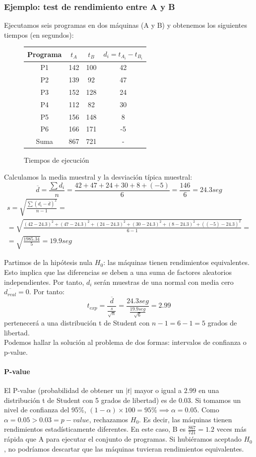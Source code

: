 \documentclass[12pt,spanish]{article}
\begin{document}
\subsubsection{Ejemplo: test de rendimiento entre A y B}
Ejecutamos seis programas en dos máquinas (A y B) y obtenemos los siguientes tiempos (en segundos):
\begin{figure}[H]
	\centering
	\begin{tabular}{|c|c|c|c|}
		\hline
		Programa & $t_A$ & $t_B$ & $d_i=t_{A_i}-t_{B_i}$\\
		\hline
		P1 & 142 & 100 & 42 \\
		\hline
		P2 & 139 & 92 & 47 \\
		\hline
		P3 & 152 & 128 & 24\\
		\hline
		P4 & 112 & 82 & 30\\
		\hline
		P5 & 156 & 148 & 8\\
		\hline
		P6 & 166 & 171 & -5\\
		\hline
		Suma & 867 & 721 & -\\
		\hline
	\end{tabular}
	\caption{Tiempos de ejecución}
\end{figure}
Calculamos la media muestral y la desviación típica muestral:
\begin{equation*}
	\overline{d}=\frac{\sum{d_i}}{n}=\frac{42+47+24+30+8+(-5)}{6}=\frac{146}{6}=24.3 seg
\end{equation*}
\begin{gather*}
		s=\sqrt{\frac{\sum{(d_i-\overline{d})^2}
		}{n-1}}=\\
		=\sqrt{\frac{(42-24.3)^2+(47-24.3)^2+(24-24.3)^2+(30-24.3)^2+(8-24.3)^2+((-5)-24.3)^2}{6-1}} =\\ = \sqrt{\frac{1985.34}{5}}=19.9 seg
\end{gather*}

Partimos de la hipótesis nula $H_0$: las máquinas tienen rendimientos equivalentes. Esto implica que las diferencias se deben a una suma de factores aleatorios independientes. Por tanto, $d_i$ serán muestras de una normal con media cero $\overline{d_{real}}=0$. Por tanto:
\begin{equation*}
	t_{exp}=\frac{\overline{d}}{\frac{s}{\sqrt{n}}}=\frac{24.3 seg}{\frac{19.9 seg}{\sqrt{6}}}=2.99
\end{equation*}
pertenecerá a una distribución t de Student con $n-1=6-1=5$ grados de libertad.\\
Podemos hallar la solución al problema de dos formas: intervalos de confianza o p-value.
\paragraph{P-value}
El P-value (probabilidad de obtener un $|t|$ mayor o igual a $2.99$ en una distribución t de Student con 5 grados de libertad) es de $0.03$. Si tomamos un nivel de confianza del 95\%, $(1-\alpha) \times 100 = 95\% \implies \alpha=0.05$. Como $\alpha=0.05 > 0.03 = p-value$, rechazamos $H_0$. Es decir, las máquinas tienen rendimientos estadísticamente diferentes. En este caso, B es $\frac{867}{721}=1.2$ veces más rápida que A para ejecutar el conjunto de programas. Si hubiéramos aceptado $H_0$, no podríamos descartar que las máquinas tuvieran rendimientos equivalentes.
\end{document}
